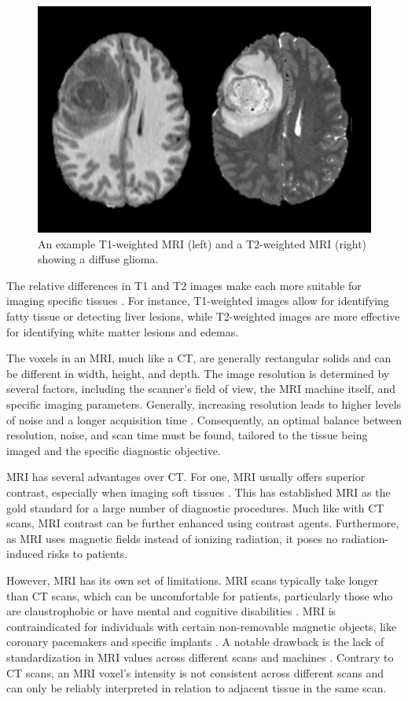 \begin{figure}[!b]
 \centering
 \includegraphics[width=0.65\linewidth]{images/mri-t1-t2-example}
 \caption{An example T1-weighted MRI (left) and a T2-weighted MRI (right) showing a diffuse glioma. \cite{calabreseUniversityCaliforniaSan2022}}
 \label{fig:t1-t2-example}
 \end{figure}
 
 The relative differences in T1 and T2 images make each more suitable for imaging specific tissues \cite{boaventuraT1T2weightedRatio2022}. For instance, T1-weighted images allow for identifying fatty tissue or detecting liver lesions, while T2-weighted images are more effective for identifying white matter lesions and edemas.
  
 The voxels in an MRI, much like a CT, are generally rectangular solids and can be different in width, height, and depth. The image resolution is determined by several factors, including the scanner's field of view, the MRI machine itself, and specific imaging parameters. Generally, increasing resolution leads to higher levels of noise and a longer acquisition time \cite{macovskiNoiseMRI1996}. Consequently, an optimal balance between resolution, noise, and scan time must be found, tailored to the tissue being imaged and the specific diagnostic objective.
 
 MRI has several advantages over CT. For one, MRI usually offers superior contrast, especially when imaging soft tissues \cite{changMagneticResonanceImaging1987}. This has established MRI as the gold standard for a large number of diagnostic procedures. Much like with CT scans, MRI contrast can be further enhanced using contrast agents. Furthermore, as MRI uses magnetic fields instead of ionizing radiation, it poses no radiation-induced risks to patients.
 
However, MRI has its own set of limitations. MRI scans typically take longer than CT scans, which can be uncomfortable for patients, particularly those who are claustrophobic or have mental and cognitive disabilities \cite{thorpeClaustrophobiaMRIRole2008}. MRI is contraindicated for individuals with certain non-removable magnetic objects, like coronary pacemakers and specific implants \cite{steccoPatientSafetyIssues2007}. A notable drawback is the lack of standardization in MRI values across different scans and machines \cite{wahidIntensityStandardizationMethods2021}. Contrary to CT scans, an MRI voxel's intensity is not consistent across different scans and can only be reliably interpreted in relation to adjacent tissue in the same scan.

